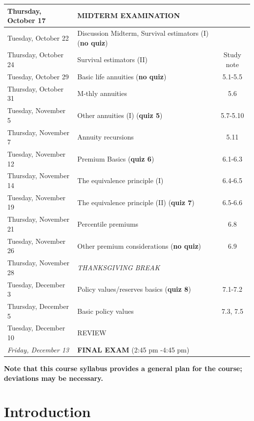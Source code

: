 \documentclass[11pt,fleqn,oneside]{book}
\begin{document}
\begin{center}
\begin{tabular}{|| l | l | c ||}
\hline
Thursday, October 17		&  \textbf{MIDTERM EXAMINATION}			       			&   \\
\hline
Tuesday, October 22			& Discussion Midterm, Survival estimators	 (I) (\textbf{no quiz})		&  \\
Thursday, October 24       		& Survival estimators (II)	 			       					& Study note \\ 			 
Tuesday, October 29	         	& Basic life annuities (\textbf{no quiz})			       			& 5.1-5.5 \\
Thursday, October 31		& M-thly annuities  										& 5.6 \\
Tuesday, November 5		& Other annuities (I)	(\textbf{quiz 5})							& 5.7-5.10 \\	
Thursday, November 7	     	& Annuity recursions  									& 5.11 \\ 		
Tuesday, November 12     		& Premium Basics (\textbf{quiz 6})              					& 6.1-6.3 \\ 					
Thursday, November 14 		& The equivalence principle (I) 								& 6.4-6.5 \\
Tuesday, November 19     		& The equivalence principle (II) (\textbf{quiz 7})     	                		& 6.5-6.6 \\	
Thursday, November 21 	     	& Percentile premiums      								& 6.8 \\
Tuesday, November 26		& Other premium considerations  (\textbf{no quiz})				& 6.9 \\
\hline				         		
Thursday, November 28		&  \textit{THANKSGIVING BREAK}							& \\
\hline
Tuesday, December 3 	         & Policy values/reserves basics (\textbf{quiz 8})				& 7.1-7.2 \\
Thursday, December 5		& Basic policy values									& 7.3, 7.5 \\
Tuesday, December 10	         & REVIEW											&  \\
\textit{Friday, December 13}	& \textbf{FINAL EXAM} (2:45 pm -4:45 pm) 					& \\
\hline
\hline
\end{tabular}	
\end{center}
\normalsize

\textbf{
Note that this course syllabus provides a general plan for the course; deviations may be necessary.
}


\chapter{Introduction}
\label{CHAPINTRO}
\end{document}
